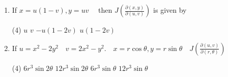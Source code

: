 \begin{enumerate}
	\item If $x=u(1-v), y=u v \quad$ then $J\left(\frac{\partial(x, y)}{\partial(u, v)}\right)$ is given by
	 \begin{tasks}(4)
		\task[\textbf{a.}]$u$
		\task[\textbf{b.}]$v$
		\task[\textbf{c.}]$-u(1-2 v)$
		\task[\textbf{d.}] $u(1-2 v)$
	\end{tasks}
	\item If $u=x^{2}-2 y^{2} \quad v=2 x^{2}-y^{2} . \quad x=r \cos \theta, y=r \sin \theta \quad J\left(\frac{\partial(u, v)}{\partial(r, \theta)}\right)$
	 \begin{tasks}(4)
		\task[\textbf{a.}]$6 r^{3} \sin 2 \theta$
		\task[\textbf{b.}]$12 r^{3} \sin 2 \theta$
		\task[\textbf{c.}]$6 r^{3} \sin \theta$
		\task[\textbf{d.}] $12 r^{3} \sin \theta$
	\end{tasks}
	
	
	
	
	
	
	
	
	
\end{enumerate}